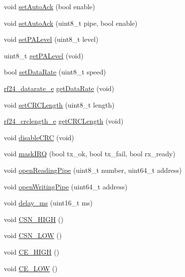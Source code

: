 \begin{DoxyCompactItemize}
\item 
void \hyperlink{classNRF24L01_a33b1c7dd1cad95dae57ef87bf3dce5c8}{set\+Auto\+Ack} (bool enable)
\item 
void \hyperlink{classNRF24L01_a79cab6f958c8d9e18273d7c4750480fd}{set\+Auto\+Ack} (uint8\+\_\+t pipe, bool enable)
\item 
void \hyperlink{classNRF24L01_a7319961d6048e32546ad5df934bd42d8}{set\+P\+A\+Level} (uint8\+\_\+t level)
\item 
uint8\+\_\+t \hyperlink{classNRF24L01_a8fdb80b79100186afad90d9a2a5c79fb}{get\+P\+A\+Level} (void)
\item 
bool \hyperlink{classNRF24L01_a9db0803c6d87e6ada7febea2240a7b1c}{set\+Data\+Rate} (uint8\+\_\+t speed)
\item 
\hyperlink{NRF24L01_8h_a82745de4aa1251b7561564b3ed1d6522}{rf24\+\_\+datarate\+\_\+e} \hyperlink{classNRF24L01_a6184de85c94400cde96b7f83b316efa8}{get\+Data\+Rate} (void)
\item 
void \hyperlink{classNRF24L01_a6081dd6dd9cdffbc1c7534ee1824201d}{set\+C\+R\+C\+Length} (uint8\+\_\+t length)
\item 
\hyperlink{NRF24L01_8h_adbe00719f3f835c82bd007081d040a7e}{rf24\+\_\+crclength\+\_\+e} \hyperlink{classNRF24L01_ac83fb86df156475aeda2ef637078fcd3}{get\+C\+R\+C\+Length} (void)
\item 
void \hyperlink{classNRF24L01_a1e997f3c946acdbe8bd622e431f80034}{disable\+C\+RC} (void)
\item 
void \hyperlink{classNRF24L01_ad23d4111c3a26d18db51eb72a5491dbb}{mask\+I\+RQ} (bool tx\+\_\+ok, bool tx\+\_\+fail, bool rx\+\_\+ready)
\item 
void \hyperlink{classNRF24L01_a02c91592a6c762c1a4e86252f8958bd6}{open\+Reading\+Pipe} (uint8\+\_\+t number, uint64\+\_\+t address)
\item 
void \hyperlink{classNRF24L01_a0fe37f8ff95b7c562ad1fc277890e29a}{open\+Writing\+Pipe} (uint64\+\_\+t address)
\item 
void \hyperlink{classNRF24L01_ad311ef5130c99ab8ddca292adfe76603}{delay\+\_\+ms} (uint16\+\_\+t ms)
\item 
void \hyperlink{classNRF24L01_a958fa3e8a0457c0c655b9652ee9dbad4}{C\+S\+N\+\_\+\+H\+I\+GH} ()
\item 
void \hyperlink{classNRF24L01_acffaad2c6b5e3713f7fe6af22d4553ef}{C\+S\+N\+\_\+\+L\+OW} ()
\item 
void \hyperlink{classNRF24L01_a85274c10cbe6317796a209913bfb0253}{C\+E\+\_\+\+H\+I\+GH} ()
\item 
void \hyperlink{classNRF24L01_aa5e261363986c590c90e7cb2adc2d75d}{C\+E\+\_\+\+L\+OW} ()
\end{DoxyCompactItemize}


